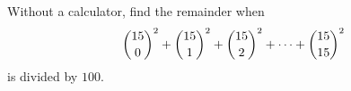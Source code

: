 Without a calculator, find the remainder when
\[\dbinom{15}{0}^2+\dbinom{15}{1}^2+\dbinom{15}{2}^2+\cdots+\dbinom{15}{15}^2\]
is divided by $100$.
